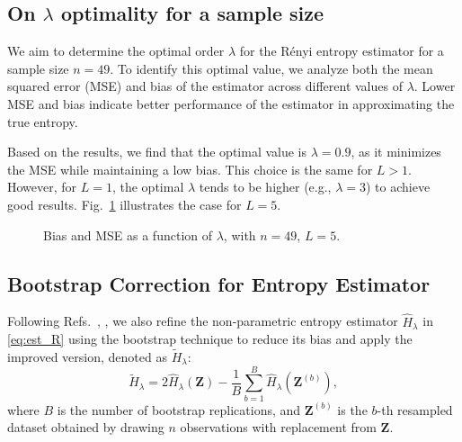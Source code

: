 \documentclass[
  journal,
]{IEEEtran}%
\begin{document}
\subsection{\texorpdfstring{On \(\lambda\) optimality for a sample
size}{On \textbackslash lambda optimality for a sample size}}\label{on-lambda-optimality-for-a-sample-size}

We aim to determine the optimal order \(\lambda\) for the Rényi entropy
estimator for a sample size \(n=49\). To identify this optimal value, we
analyze both the mean squared error (MSE) and bias of the estimator
across different values of \(\lambda\). Lower MSE and bias indicate
better performance of the estimator in approximating the true entropy.

Based on the results, we find that the optimal value is
\(\lambda = 0.9\), as it minimizes the MSE while maintaining a low bias.
This choice is the same for \(L > 1\). However, for \(L = 1\), the
optimal \(\lambda\) tends to be higher (e.g., \(\lambda = 3\)) to
achieve good results. Fig.~\ref{fig-plotf} illustrates the case for
\(L = 5\).

\begin{figure}[hbt]


\caption{\label{fig-plotf}Bias and MSE as a function of \(\lambda\),
with \(n=49\), \(L=5\).}

\end{figure}%

\subsection{Bootstrap Correction for Entropy
Estimator}\label{bootstrap-correction-for-entropy-estimator}

Following Refs.~,
, we also refine the non-parametric
entropy estimator \(\widehat{H}_{\lambda}\) in \eqref{eq:est_R} using
the bootstrap technique to reduce its bias and apply the improved
version, denoted as \(\widetilde{H}_{\lambda}\): \[
\widetilde{H}_{\lambda} = 2\widehat{H}_{\lambda}(\bm{Z}) - \frac{1}{B} \sum_{b=1}^{B} \widehat{H}_{\lambda}(\bm{Z}^{(b)}),
\] where \(B\) is the number of bootstrap replications, and
\(\bm{Z}^{(b)}\) is the \(b\)-th resampled dataset obtained by drawing
\(n\) observations with replacement from \(\bm{Z}\).
\end{document}
